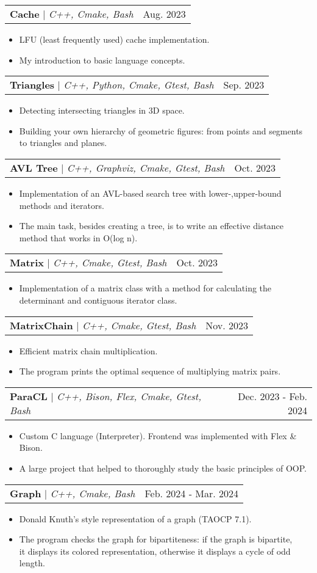 \documentclass[letterpaper,11pt]{article}
\makeatletter
\newcommand{\resumeItem}[1]{
  \item\small{
    {#1 \vspace{-2pt}}
  }
}
\newcommand{\resumeProjectHeading}[2]{
    \item
    \begin{tabular*}{0.97\textwidth}{l@{\extracolsep{\fill}}r}
      \small#1 & #2 \\
    \end{tabular*}\vspace{-7pt}
}
\newcommand{\resumeItemListStart}{\begin{itemize}}
\newcommand{\resumeItemListEnd}{\end{itemize}\vspace{-5pt}}
\makeatother
\begin{document}
        \resumeProjectHeading
        {\textbf{Cache} $|$ \footnotesize\emph{C++, Cmake, Bash} }{Aug. 2023}
        \resumeItemListStart
            \resumeItem{LFU (least frequently used) cache implementation.}
            \resumeItem{My introduction to basic language concepts.}
          \resumeItemListEnd 
    \resumeProjectHeading
        {\textbf{Triangles} $|$ \footnotesize\emph{C++, Python, Cmake, Gtest, Bash}}{Sep. 2023}
        \resumeItemListStart
            \resumeItem{Detecting intersecting triangles in 3D space.}
            \resumeItem{Building your own hierarchy of geometric figures: from points and segments to triangles and planes.}
          \resumeItemListEnd
      \resumeProjectHeading
        {\textbf{AVL Tree} $|$ \footnotesize\emph{C++, Graphviz, Cmake, Gtest, Bash}}{Oct. 2023}
        \resumeItemListStart
            \resumeItem{Implementation of an AVL-based search tree with lower-,upper-bound methods and iterators.}
            \resumeItem{The main task, besides creating a tree, is to write an effective distance method that works in O(log n).}
        \resumeItemListEnd
    \resumeProjectHeading
        {\textbf{Matrix} $|$ \footnotesize\emph{C++, Cmake, Gtest, Bash}}{Oct. 2023}
        \resumeItemListStart
            \resumeItem{Implementation of a matrix class with a method for calculating the determinant and contiguous iterator class.}
        \resumeItemListEnd
    \resumeProjectHeading
        {\textbf{MatrixChain} $|$ \footnotesize\emph{C++, Cmake, Gtest, Bash}}{Nov. 2023}
        \resumeItemListStart
            \resumeItem{Efficient matrix chain multiplication.}
            \resumeItem{The program prints the optimal sequence of multiplying matrix pairs.}
        \resumeItemListEnd
    \resumeProjectHeading
        {\textbf{ParaCL} $|$ \footnotesize\emph{C++, Bison, Flex, Cmake, Gtest, Bash}}{Dec. 2023 - Feb. 2024}
        \resumeItemListStart
            \resumeItem{Custom C language (Interpreter). Frontend was implemented with Flex \& Bison.}
            \resumeItem{A large project that helped to thoroughly study the basic principles of OOP.}
        \resumeItemListEnd
    \resumeProjectHeading
        {\textbf{Graph} $|$ \footnotesize\emph{C++, Cmake, Bash}}{Feb. 2024 - Mar. 2024}
        \resumeItemListStart
            \resumeItem{Donald Knuth's style representation of a graph (TAOCP 7.1).}
            \resumeItem{The program checks the graph for bipartiteness: if the graph is bipartite,\\ it displays its colored representation, otherwise it displays a cycle of odd length.}
        \resumeItemListEnd
\end{document}
